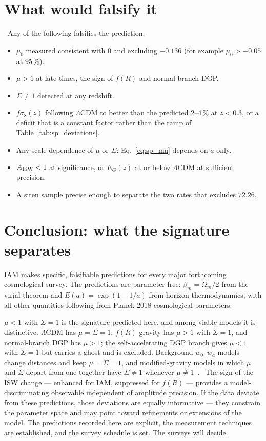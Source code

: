 \section{What would falsify it}\label{sec:sp_falsify}
\prediction\ Any of the following falsifies the prediction:
\begin{itemize}
\item $\mu_0$ measured consistent with $0$ and excluding $-0.136$ (for example $\mu_0>-0.05$ at $95\,\%$).
\item $\mu>1$ at late times, the sign of $f(R)$ and normal-branch DGP.
\item $\Sigma\neq1$ detected at any redshift.
\item $f\sigma_8(z)$ following $\Lambda$CDM to better than the predicted $2$--$4\,\%$ at $z<0.3$, or a deficit that is a constant factor rather than the ramp
of Table~\ref{tab:sp_deviations}.
\item Any scale dependence of $\mu$ or $\Sigma$: Eq.~\eqref{eq:sp_mu} depends on $a$ only.
\item $A_{\rm ISW}<1$ at significance, or $E_G(z)$ at or below $\Lambda$CDM at sufficient precision.
\item A siren sample precise enough to separate the two rates that excludes $72.26$.
\end{itemize}

\section{Conclusion: what the signature separates}\label{sec:sp_separates}
IAM makes specific, falsifiable predictions for every major forthcoming cosmological survey. The predictions are parameter-free:
$\beta_m=\Omega_m/2$ from the virial theorem and $E(a)=\exp(1-1/a)$ from horizon thermodynamics, with all other quantities following from Planck
2018 cosmological parameters. \prediction

$\mu<1$ with $\Sigma=1$ is the signature predicted here, and among viable models it is distinctive. $\Lambda$CDM has $\mu=\Sigma=1$. $f(R)$ gravity
has $\mu>1$ with $\Sigma=1$, and normal-branch DGP has $\mu>1$; the self-accelerating DGP branch gives $\mu<1$ with $\Sigma=1$ but carries a ghost and
is excluded. Background $w_0$--$w_a$ models change distances and keep $\mu=\Sigma=1$, and modified-gravity models in which $\mu$ and $\Sigma$
depart from one together have $\Sigma\neq1$ whenever $\mu\neq1$~\cite{PogosianSilvestri2008,PogosianSilvestri2016}. \derived\ The sign of the ISW change --- enhanced for IAM, suppressed for
$f(R)$ --- provides a model-discriminating observable independent of amplitude precision. If the data deviate from these predictions, those
deviations are equally informative --- they constrain the parameter space and may point toward refinements or extensions of the model. The
predictions recorded here are explicit, the measurement techniques are established, and the survey schedule is set. The surveys will decide.

